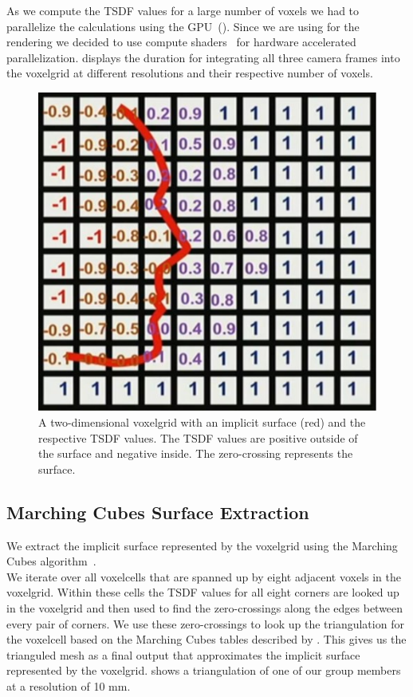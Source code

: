 \documentclass[10pt,twocolumn,letterpaper]{article}
\begin{document}
As we compute the TSDF values for a large number of voxels we had to parallelize the calculations using the GPU~(). Since we are using \opengl{} for the rendering we decided to use \opengl{} compute shaders~\cite{Authors1} for hardware accelerated parallelization.  displays the duration for integrating all three camera frames into the voxelgrid at different resolutions and their respective number of voxels. \\

\begin{figure}[t]
\begin{center}
\includegraphics[width=0.6\linewidth]{imgs/tsdf}
\end{center}
 \caption{A two-dimensional voxelgrid with an implicit surface (red) and the respective TSDF values. The TSDF values are positive outside of the surface and negative inside. The zero-crossing represents the surface.}
 \label{fig:voxelgrid}
\end{figure}

\subsection{Marching Cubes Surface Extraction}
We extract the implicit surface represented by the voxelgrid using the Marching Cubes algorithm~\cite{MarchingCubes}.\\
We iterate over all voxelcells that are spanned up by eight adjacent voxels in the voxelgrid. Within these cells the TSDF values for all eight corners are looked up in the voxelgrid and then used to find the zero-crossings along the edges between every pair of corners. We use these zero-crossings to look up the triangulation for the voxelcell based on the Marching Cubes tables described by \cite{MarchingCubes}. This gives us the trianguled mesh as a final output that approximates the implicit surface represented by the voxelgrid.  shows a triangulation of one of our group members at a resolution of 10 mm.
\end{document}
